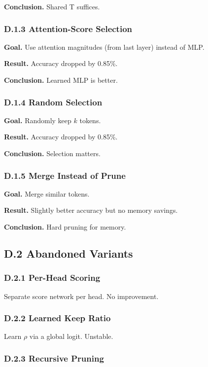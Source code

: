 \textbf{Conclusion.} Shared T suffices.

\subsubsection{D.1.3 Attention-Score Selection}

\textbf{Goal.} Use attention magnitudes (from last layer) instead of MLP.

\textbf{Result.} Accuracy dropped by 0.85\%.

\textbf{Conclusion.} Learned MLP is better.

\subsubsection{D.1.4 Random Selection}

\textbf{Goal.} Randomly keep $k$ tokens.

\textbf{Result.} Accuracy dropped by 0.85\%.

\textbf{Conclusion.} Selection matters.

\subsubsection{D.1.5 Merge Instead of Prune}

\textbf{Goal.} Merge similar tokens.

\textbf{Result.} Slightly better accuracy but no memory savings.

\textbf{Conclusion.} Hard pruning for memory.

\subsection{D.2 Abandoned Variants}

\subsubsection{D.2.1 Per-Head Scoring}

Separate score network per head. No improvement.

\subsubsection{D.2.2 Learned Keep Ratio}

Learn $\rho$ via a global logit. Unstable.

\subsubsection{D.2.3 Recursive Pruning}

